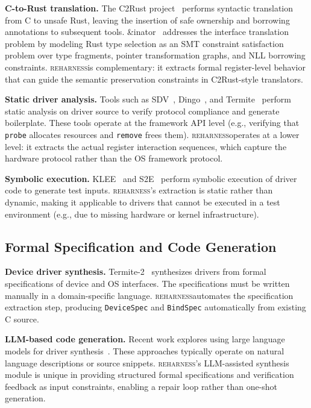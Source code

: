 \documentclass[sigconf,review]{acmart}
\newcommand{\reharness}{\textsc{reharness}}
\begin{document}
\textbf{C-to-Rust translation.} The C2Rust project~\cite{emrath2021c2rust} performs syntactic translation from C to unsafe Rust, leaving the insertion of safe ownership and borrowing annotations to subsequent tools. \&inator~\cite{andinator2026} addresses the interface translation problem by modeling Rust type selection as an SMT constraint satisfaction problem over type fragments, pointer transformation graphs, and NLL borrowing constraints. \reharness is complementary: it extracts formal register-level behavior that can guide the semantic preservation constraints in C2Rust-style translators.

\textbf{Static driver analysis.} Tools such as SDV~\cite{ball2006thorough}, Dingo~\cite{ryzhyk2009dingo}, and Termite~\cite{ryzhyk2009termite} perform static analysis on driver source to verify protocol compliance and generate boilerplate. These tools operate at the framework API level (e.g., verifying that \texttt{probe} allocates resources and \texttt{remove} frees them). \reharness operates at a lower level: it extracts the actual register interaction sequences, which capture the hardware protocol rather than the OS framework protocol.

\textbf{Symbolic execution.} KLEE~\cite{cadar2008klee} and S2E~\cite{chipounov2011s2e} perform symbolic execution of driver code to generate test inputs. \reharness's extraction is static rather than dynamic, making it applicable to drivers that cannot be executed in a test environment (e.g., due to missing hardware or kernel infrastructure).

\subsection{Formal Specification and Code Generation}

\textbf{Device driver synthesis.} Termite-2~\cite{ryzhyk2014termite2} synthesizes drivers from formal specifications of device and OS interfaces. The specifications must be written manually in a domain-specific language. \reharness automates the specification extraction step, producing \texttt{DeviceSpec} and \texttt{BindSpec} automatically from existing C source.

\textbf{LLM-based code generation.} Recent work explores using large language models for driver synthesis~\cite{roelofs2023large}. These approaches typically operate on natural language descriptions or source snippets. \reharness's LLM-assisted synthesis module is unique in providing structured formal specifications and verification feedback as input constraints, enabling a repair loop rather than one-shot generation.
\end{document}
